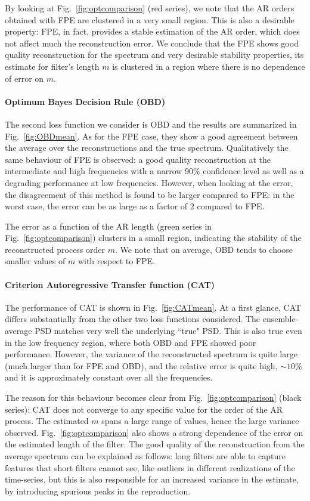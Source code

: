 \documentclass[twocolumn,showpacs,preprintnumbers,nofootinbib,prd,
superscriptaddress,10pt]{revtex4-1}
\begin{document}
By looking at Fig.~\ref{fig:optcomparison} (red series), we note that the AR orders obtained with 
FPE are clustered in a very small region. This is also a desirable property: FPE, in fact, provides a stable 
estimation of the AR order, which does not affect much the reconstruction error.
We conclude that the FPE shows good quality reconstruction for the spectrum and very desirable stability properties, its estimate for filter's length $m$ is clustered in a region where there is no dependence of error on $m$. 
\paragraph{Optimum Bayes Decision Rule (OBD)}
The second loss function we consider is OBD and the results are summarized in Fig.~\ref{fig:OBDmean}. As for the FPE case, they show a good agreement between the average over the reconstructions and the true spectrum.
Qualitatively the same behaviour of FPE is observed: a good quality reconstruction at the intermediate and high frequencies with a narrow $90\%$ confidence level as well as a degrading performance at low frequencies.
However, when looking at the error, the disagreement of this method is found to be larger compared to FPE: 
in the worst case, the error can be as large as a factor of $2$ compared to FPE. 

The error as a function of the AR length (green series in Fig.~\ref{fig:optcomparison}) clusters in a small region, indicating the stability of the reconstructed process order $m$. We note that on average, OBD tends to choose smaller values of $m$ with respect to FPE.

\paragraph{Criterion Autoregressive Transfer function (CAT)}
The performance of CAT is shown in Fig.~\ref{fig:CATmean}. At a first glance, CAT differs substantially from the other two loss functions considered.
The ensemble-average PSD matches very well the underlying ``true" PSD. This is also true even in the low frequency region, 
where both OBD and FPE showed poor performance.
However, the variance of the reconstructed spectrum is quite large (much larger than for FPE and OBD), and the relative error is quite high, $\sim 10\%$ and it is approximately constant over all the frequencies.

The reason for this behaviour becomes clear from Fig.~\ref{fig:optcomparison} (black series): CAT does not converge 
to any specific value for the order of the AR process. The estimated $m$ spans a large range of values, hence the large variance observed.
Fig.~\ref{fig:optcomparison} also shows a strong dependence of the error on the estimated length of the filter. The good quality of the reconstruction from the average spectrum can be explained as follows: long filters are able to capture features that short filters cannot see, like outliers in different realizations of the time-series, but this is also responsible for an increased variance in the estimate, by introducing spurious peaks in the reproduction.
\end{document}
